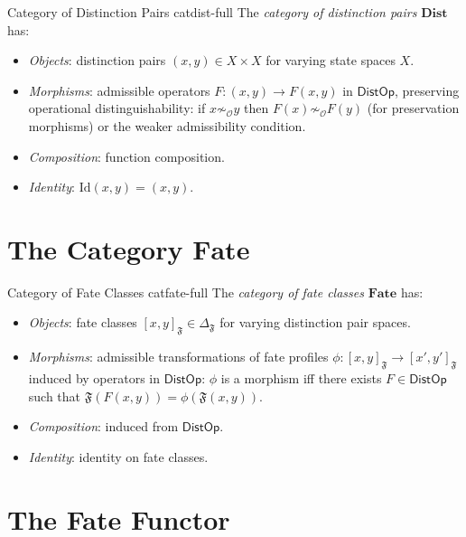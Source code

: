 \documentclass[12pt,twoside,openright]{book}
\newcommand{\fateClasses}{\Delta_{\mathfrak{F}}}
\newcommand{\obs}{\mathcal{O}}
\newcommand{\fateMap}{\mathfrak{F}}
\newcommand{\distOp}{\mathsf{DistOp}}
\newcommand{\fateClass}[1]{[#1]_{\mathfrak{F}}}
\newcommand{\catDist}{\mathbf{Dist}}
\newcommand{\catFate}{\mathbf{Fate}}
\providecommand{\fateClasses}{\Delta_{\mathfrak{F}}}
\providecommand{\fateClass}[1]{[#1]_{\mathfrak{F}}}
\providecommand{\catDist}{\mathbf{Dist}}
\providecommand{\catFate}{\mathbf{Fate}}
\begin{document}
\begin{definition}{Category of Distinction Pairs}%
  {catdist-full}
The \emph{category of distinction pairs} $\catDist$ has:
\begin{itemize}[nosep,leftmargin=2em]
  \item \emph{Objects}: distinction pairs $(x,y)\in
    X\times X$ for varying state spaces $X$.
  \item \emph{Morphisms}: admissible operators
    $F:(x,y)\to F(x,y)$ in $\distOp$, preserving
    operational distinguishability: if $x\not\sim_\obs y$
    then $F(x)\not\sim_\obs F(y)$ (for preservation
    morphisms) or the weaker admissibility condition.
  \item \emph{Composition}: function composition.
  \item \emph{Identity}: $\mathrm{Id}(x,y)=(x,y)$.
\end{itemize}
\end{definition}

\section{The Category $\catFate$}

\begin{definition}{Category of Fate Classes}%
  {catfate-full}
The \emph{category of fate classes} $\catFate$ has:
\begin{itemize}[nosep,leftmargin=2em]
  \item \emph{Objects}: fate classes $\fateClass{x,y}
    \in\fateClasses$ for varying distinction pair spaces.
  \item \emph{Morphisms}: admissible transformations of
    fate profiles $\phi:\fateClass{x,y}\to
    \fateClass{x',y'}$ induced by operators in $\distOp$:
    $\phi$ is a morphism iff there exists $F\in\distOp$
    such that $\fateMap(F(x,y))=\phi(\fateMap(x,y))$.
  \item \emph{Composition}: induced from $\distOp$.
  \item \emph{Identity}: identity on fate classes.
\end{itemize}
\end{definition}

\section{The Fate Functor}
\end{document}
